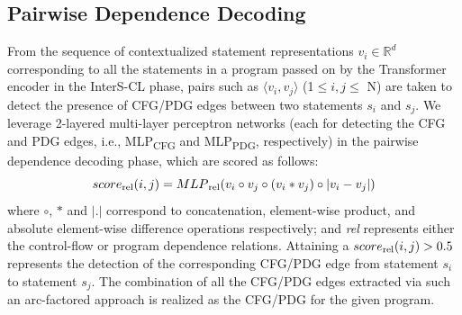 
\vspace{1pt}
\subsection{\bf Pairwise Dependence Decoding}

From the sequence of contextualized statement representations $v_i \in
\mathbb{R}^d$ corresponding to all the statements in a program passed
on by the Transformer encoder in the InterS-CL phase, pairs such
as $\langle v_i, v_j \rangle$ (1$\leq i, j\leq$ N) are taken to detect
the presence of CFG/PDG edges between two statements $s_i$ and
$s_j$. We leverage 2-layered multi-layer perceptron networks (each
for detecting the CFG and PDG edges, i.e., MLP\textsubscript{CFG} and
MLP\textsubscript{PDG}, respectively) in the pairwise dependence
decoding phase, which are scored as follows:
\begin{equation}
\centering
    score\textsubscript{rel}(i, j) = MLP\textsubscript{rel}(v_i \circ v_j \circ (v_i * v_j) \circ |v_i - v_j|)
\end{equation}
where $\circ$, $*$ and $|.|$ correspond to concatenation, element-wise
product, and absolute element-wise difference operations respectively;
and \textit{rel} represents either the control-flow or program
dependence relations. Attaining a $score\textsubscript{rel}(i, j) >
0.5$ represents the detection of the corresponding CFG/PDG edge from
statement $s_i$ to statement $s_j$. The combination of all the CFG/PDG
edges extracted via such an arc-factored approach is realized as the
CFG/PDG for the given program.

